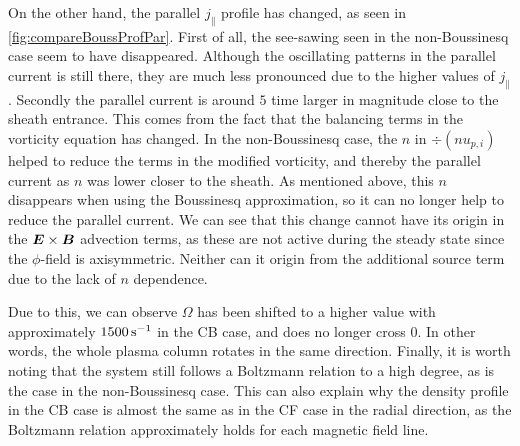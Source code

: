 On the other hand, the parallel $j_\|$ profile has changed, as seen in \cref{fig:compareBoussProfPar}.
First of all, the see-sawing seen in the non-Boussinesq case seem to have disappeared.
Although the oscillating patterns in the parallel current is still there, they are much less pronounced due to the higher values of $j_\|$.
Secondly the parallel current is around $5$ time larger in magnitude close to the sheath entrance.
This comes from the fact that the balancing terms in the vorticity equation has changed.
In the non-Boussinesq case, the $n$ in $\div(nu_{p,i})$ helped to reduce the terms in the modified vorticity, and thereby the parallel current as $n$ was lower closer to the sheath.
As mentioned above, this $n$ disappears when using the Boussinesq approximation, so it can no longer help to reduce the parallel current.
We can see that this change cannot have its origin in the $\boldsymbol{E}\times\boldsymbol{B}$ advection terms, as these are not active during the steady state since the $\phi$-field is axisymmetric.
Neither can it origin from the additional source term due to the lack of $n$ dependence.

Due to this, we can observe $\Omega$ has been shifted to a higher value with approximately $1500 \, \text{s}^{-1}$ in the CB case, and does no longer cross $0$.
In other words, the whole plasma column rotates in the same direction.
Finally, it is worth noting that the system still follows a Boltzmann relation to a high degree, as is the case in the non-Boussinesq case.
This can also explain why the density profile in the CB case is almost the same as in the CF case in the radial direction, as the Boltzmann relation approximately holds for each magnetic field line.
%

